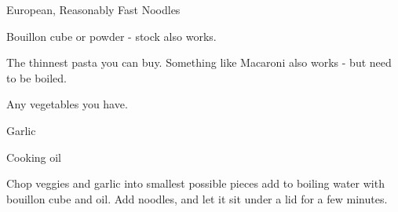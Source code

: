 \begin{recipe}{European, Reasonably Fast Noodles}
  \begin{ingr}[1]
  \item Bouillon cube or powder - stock also works.
  \item The thinnest pasta you can buy. Something like Macaroni also works
    - but need to be boiled.
  \item Any vegetables you have.
  \item Garlic
  \item Cooking oil
  \end{ingr}

  Chop veggies and garlic into smallest possible pieces add to
  boiling water with
  bouillon cube and oil. Add noodles, and let it sit under a lid for
  a few minutes.

\end{recipe}
